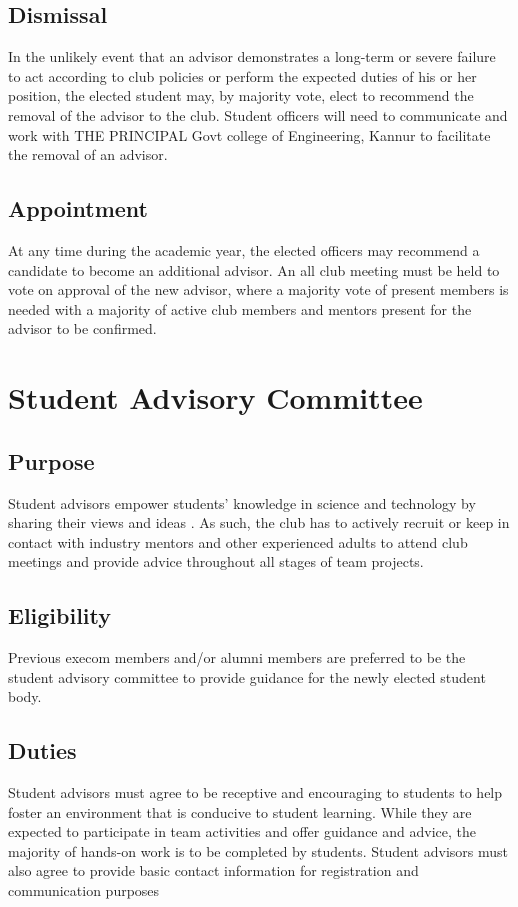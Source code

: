 \subsection{Dismissal}
In the unlikely event that an advisor demonstrates a long-term or severe failure to act according to club policies or perform the expected duties of his or her position, the elected student may, by majority vote, elect to recommend the removal of the advisor to the club. Student officers will need to communicate and work with THE PRINCIPAL Govt college of Engineering, Kannur to facilitate the removal of an advisor.

\subsection{Appointment}
At any time during the academic year, the elected officers may recommend a candidate to become an additional advisor. An all club meeting must be held to vote on approval of the new advisor, where a majority vote of present members is needed with a majority of active club members and mentors present for the advisor to be confirmed.

\section{Student Advisory Committee}
\subsection{Purpose}
Student advisors empower students' knowledge in science and technology by sharing their views and ideas . As such, the club has to actively recruit or keep in contact with industry mentors and other experienced adults to attend club meetings and provide advice throughout all stages of team projects.

\subsection{Eligibility}
Previous execom members and/or alumni members are preferred to be the student advisory committee to provide guidance for the newly elected student body.

\subsection{Duties}
Student advisors must agree to be receptive and encouraging to students to help foster an environment that is conducive to student learning. While they are expected to participate in team activities and offer guidance and advice, the majority of hands-on work is to be completed by students. Student advisors must also agree to provide basic contact information for registration and communication purposes 

